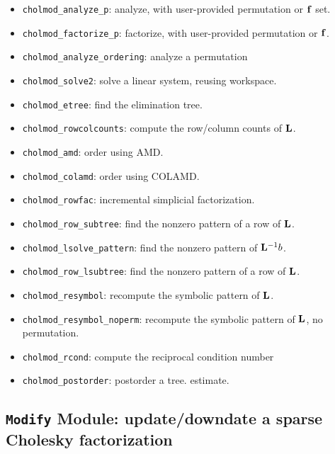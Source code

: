 \documentclass[11pt]{article}
\newcommand{\m}[1]{{\bf{#1}}}       %
\begin{document}
    \begin{itemize}
    \item {\tt cholmod\_analyze\_p}: analyze, with user-provided permutation or
    $\m{f}$ set.
    \item {\tt cholmod\_factorize\_p}: factorize, with user-provided
    permutation or $\m{f}$.
    \item {\tt cholmod\_analyze\_ordering}:  analyze a permutation
    \item {\tt cholmod\_solve2}: solve a linear system, reusing workspace.
    \item {\tt cholmod\_etree}: find the elimination tree.
    \item {\tt cholmod\_rowcolcounts}: compute the row/column counts of
    $\m{L}$.
    \item {\tt cholmod\_amd}: order using AMD.
    \item {\tt cholmod\_colamd}: order using COLAMD.
    \item {\tt cholmod\_rowfac}: incremental simplicial factorization.
    \item {\tt cholmod\_row\_subtree}: find the nonzero pattern of a row of
    $\m{L}$.
    \item {\tt cholmod\_lsolve\_pattern}: find the nonzero pattern of
    $\m{L}^{-1}b$.
    \item {\tt cholmod\_row\_lsubtree}: find the nonzero pattern of a row of
    $\m{L}$.
    \item {\tt cholmod\_resymbol}: recompute the symbolic pattern of $\m{L}$.
    \item {\tt cholmod\_resymbol\_noperm}: recompute the symbolic pattern of
    $\m{L}$, no permutation.
    \item {\tt cholmod\_rcond}: compute the reciprocal condition number
    \item {\tt cholmod\_postorder}: postorder a tree.
    estimate.
    \end{itemize}

\subsection{{\tt Modify} Module: update/downdate a sparse Cholesky
factorization}
\end{document}
